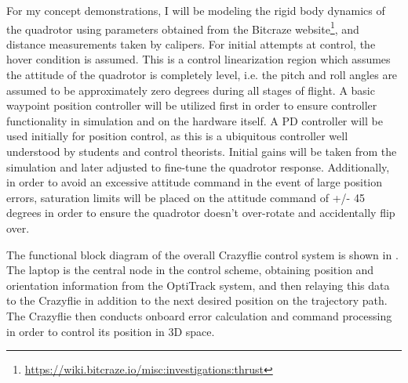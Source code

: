 \documentclass[onecolumn,10pt]{IEEEtran}
\begin{document}
For my concept demonstrations, I will be modeling the rigid body dynamics of the quadrotor using parameters obtained from the Bitcraze website\footnote{\url{https://wiki.bitcraze.io/misc:investigations:thrust}}, and distance measurements taken by calipers. For initial attempts at control, the hover condition is assumed. This is a control linearization region which assumes the attitude of the quadrotor is completely level, i.e. the pitch and roll angles are assumed to be approximately zero degrees during all stages of flight. A basic waypoint position controller will be utilized first in order to ensure controller functionality in simulation and on the hardware itself. A PD controller will be used initially for position control, as this is a ubiquitous controller well understood by students and control theorists. Initial gains will be taken from the simulation \cite{hartman2014quadcopter}
 and later adjusted to fine-tune the quadrotor response. Additionally, in order to avoid an excessive attitude command in the event of large position errors, saturation limits will be placed on the attitude command of  +/- 45
 degrees in order to ensure the quadrotor doesn't over-rotate and accidentally flip over. 

The functional block diagram of the overall Crazyflie control system is shown in . The laptop is the central node in the control scheme, obtaining position and orientation information from the OptiTrack system, and then relaying this data to the Crazyflie in addition to the next desired position on the trajectory path. The Crazyflie then conducts onboard error calculation and command processing in order to control its position in 3D space.

\end{document}
